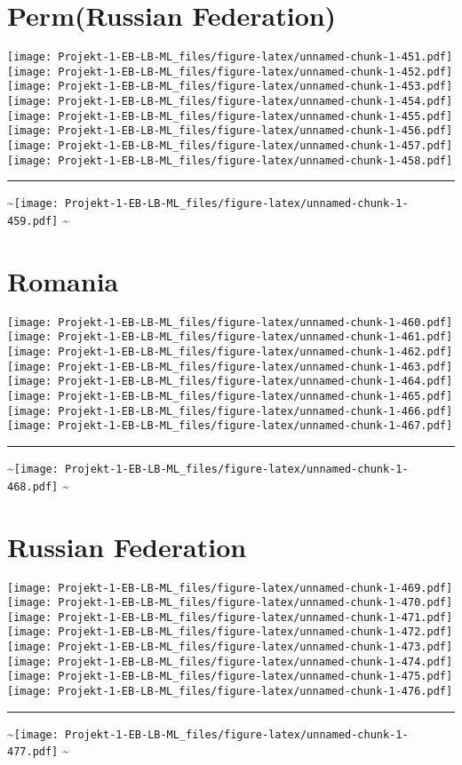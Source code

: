 \documentclass[]{article}
\begin{document}
\section{Perm(Russian Federation)}\label{permrussian-federation}

\texttt{[image: Projekt-1-EB-LB-ML\_files/figure-latex/unnamed-chunk-1-451.pdf]}
\texttt{[image: Projekt-1-EB-LB-ML\_files/figure-latex/unnamed-chunk-1-452.pdf]}
\texttt{[image: Projekt-1-EB-LB-ML\_files/figure-latex/unnamed-chunk-1-453.pdf]}
\texttt{[image: Projekt-1-EB-LB-ML\_files/figure-latex/unnamed-chunk-1-454.pdf]}
\texttt{[image: Projekt-1-EB-LB-ML\_files/figure-latex/unnamed-chunk-1-455.pdf]}
\texttt{[image: Projekt-1-EB-LB-ML\_files/figure-latex/unnamed-chunk-1-456.pdf]}
\texttt{[image: Projekt-1-EB-LB-ML\_files/figure-latex/unnamed-chunk-1-457.pdf]}
\texttt{[image: Projekt-1-EB-LB-ML\_files/figure-latex/unnamed-chunk-1-458.pdf]}
\bigskip\hrule\bigskip
\textasciitilde{}\hfill\texttt{[image: Projekt-1-EB-LB-ML\_files/figure-latex/unnamed-chunk-1-459.pdf]}
\hfill \textasciitilde{} \vfill\eject

\section{Romania}\label{romania}

\texttt{[image: Projekt-1-EB-LB-ML\_files/figure-latex/unnamed-chunk-1-460.pdf]}
\texttt{[image: Projekt-1-EB-LB-ML\_files/figure-latex/unnamed-chunk-1-461.pdf]}
\texttt{[image: Projekt-1-EB-LB-ML\_files/figure-latex/unnamed-chunk-1-462.pdf]}
\texttt{[image: Projekt-1-EB-LB-ML\_files/figure-latex/unnamed-chunk-1-463.pdf]}
\texttt{[image: Projekt-1-EB-LB-ML\_files/figure-latex/unnamed-chunk-1-464.pdf]}
\texttt{[image: Projekt-1-EB-LB-ML\_files/figure-latex/unnamed-chunk-1-465.pdf]}
\texttt{[image: Projekt-1-EB-LB-ML\_files/figure-latex/unnamed-chunk-1-466.pdf]}
\texttt{[image: Projekt-1-EB-LB-ML\_files/figure-latex/unnamed-chunk-1-467.pdf]}
\bigskip\hrule\bigskip
\textasciitilde{}\hfill\texttt{[image: Projekt-1-EB-LB-ML\_files/figure-latex/unnamed-chunk-1-468.pdf]}
\hfill \textasciitilde{} \vfill\eject

\section{Russian Federation}\label{russian-federation}

\texttt{[image: Projekt-1-EB-LB-ML\_files/figure-latex/unnamed-chunk-1-469.pdf]}
\texttt{[image: Projekt-1-EB-LB-ML\_files/figure-latex/unnamed-chunk-1-470.pdf]}
\texttt{[image: Projekt-1-EB-LB-ML\_files/figure-latex/unnamed-chunk-1-471.pdf]}
\texttt{[image: Projekt-1-EB-LB-ML\_files/figure-latex/unnamed-chunk-1-472.pdf]}
\texttt{[image: Projekt-1-EB-LB-ML\_files/figure-latex/unnamed-chunk-1-473.pdf]}
\texttt{[image: Projekt-1-EB-LB-ML\_files/figure-latex/unnamed-chunk-1-474.pdf]}
\texttt{[image: Projekt-1-EB-LB-ML\_files/figure-latex/unnamed-chunk-1-475.pdf]}
\texttt{[image: Projekt-1-EB-LB-ML\_files/figure-latex/unnamed-chunk-1-476.pdf]}
\bigskip\hrule\bigskip
\textasciitilde{}\hfill\texttt{[image: Projekt-1-EB-LB-ML\_files/figure-latex/unnamed-chunk-1-477.pdf]}
\hfill \textasciitilde{} \vfill\eject
\end{document}
